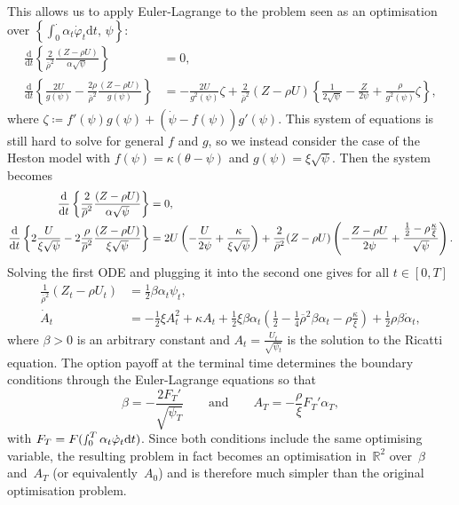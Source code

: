 \documentclass{amsart}[11pt]
\numberwithin{equation}{section}
\numberwithin{theorem}{subsection}
\numberwithin{proposition}{subsection}
\numberwithin{definition}{subsection}
\numberwithin{lemma}{subsection}
\numberwithin{assumption}{subsection}
\newcommand{\RR}{\mathbb{R}}
\newcommand{\brho}{\overline{\rho}}
\newcommand{\D}{\mathrm{d}}
\begin{document}
This allows us to apply Euler-Lagrange to the problem seen as an optimisation over $\left\{\int_{0}^{\cdot} \alpha_t \dot{\varphi}_t \D t,\,\psi\right\}$:
\begin{align*}
\frac{\D}{\D t}\left\{ \frac{2}{\brho^2} \frac{(Z - \rho U)}{\alpha \sqrt{\psi}} \right\} &= 0, \\
\frac{\D}{\D t}\left\{ \frac{2U}{g(\psi)} - \frac{2\rho}{\brho^2}\frac{(Z - \rho U)}{g(\psi)} \right\} &= - \frac{2U}{g^2(\psi)}\zeta + \frac{2}{\brho^2}(Z-\rho U)\left\{ \frac{1}{2\sqrt{\psi}} - \frac{Z}{2\psi} + \frac{\rho}{g^2(\psi)}\zeta \right\}, 
\end{align*}
where $\zeta \coloneqq f'(\psi)g(\psi) + (\dot{\psi}-f(\psi))g'(\psi)$. This system of equations is still hard to solve for general $f$ and $g$, so we instead consider the case of the Heston model with $f(\psi)=\kappa(\theta - \psi)$ and $g(\psi) = \xi \sqrt{\psi}$.
Then the system becomes
\begin{align*}
\frac{\D}{\D t}\left\{\frac{2}{\brho^2} \frac{(Z - \rho U)}{\alpha\sqrt{\psi}}\right\} &= 0,\\
\frac{\D}{\D t}\left\{2\frac{U}{\xi \sqrt{\psi}} -2\frac{\rho}{\brho^2}\frac{(Z - \rho U)}{\xi\sqrt{\psi}} \right\} &= 2U\left(-\frac{U}{2\psi} + \frac{\kappa}{\xi \sqrt{\psi}}\right)
+ \frac{2}{{\Bar\rho}^2}(Z - \rho U)\left(-\frac{Z-\rho U}{2\psi} + \frac{\frac{1}{2} - \rho \frac{\kappa}{\xi}}{\sqrt{\psi}}\right).
\end{align*}
Solving the first ODE and plugging it into the second one gives for all $t\in[0,T]$
\begin{align*}
\frac{1}{\brho^2} (Z_t - \rho U_t) &= \frac{1}{2} \beta \alpha_t \psi_t,\\
\dot{A}_t &= -\frac{1}{2}\xi A_t^2 + \kappa A_t + \frac{1}{2}\xi \beta \alpha_t \left(\frac{1}{2} - \frac{1}{4}\brho^2\beta\alpha_t - \rho\frac{\kappa}{\xi} \right) + \frac{1}{2}\rho\beta\dot{\alpha}_t,
\end{align*}
where $\beta>0$ is an arbitrary constant and $A_t = \frac{U_t}{\sqrt{\psi_t}}$ is the solution to the Ricatti equation. The option payoff at the terminal time determines the boundary conditions through the Euler-Lagrange equations so that
\[
\beta = - \frac{2F_T'}{\sqrt{\psi_T}} 
\qquad \text{and} \qquad 
A_T = -\frac{\rho}{\xi}F_T'\alpha_T,
\]
with $F_T=F(\smallint_0^T\alpha_t\dot{\varphi}_t \D t)$. 
Since both conditions include the same optimising variable, 
the resulting problem in fact becomes an optimisation in~$\RR^2$ over~$\beta$ and~$A_T$ (or equivalently~$A_0$) and is therefore much simpler than the original optimisation problem. 
\end{document}
